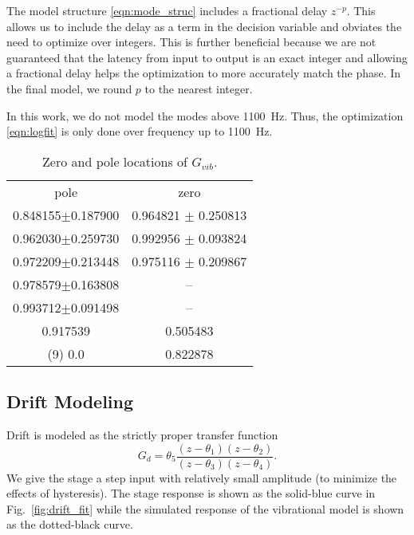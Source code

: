 \documentclass[journal,twocolumn,twoside]{IEEEtran}
\begin{document}
The model structure \eqref{eqn:mode_struc} includes a fractional delay $z^{-p}$. This allows us to include the delay as a term in the decision variable and obviates the need to optimize over integers. This is further beneficial because we are not guaranteed that the latency from input to output is an exact integer and allowing a fractional delay helps the optimization to more accurately match the phase. In the final model, we round $p$ to the nearest integer. 

In this work, we do not model the modes above 1100~Hz. Thus, the optimization \eqref{eqn:logfit} is only done over frequency up to 1100~Hz. 

\begin{table}
  \centering
  \caption{Zero and pole locations of $G_{vib}$. }
  \begin{tabular}{cc}
    pole & zero\\
    0.848155$\pm$0.187900 & 0.964821 $\pm$ 0.250813\\ 
    0.962030$\pm$0.259730 & 0.992956 $\pm$ 0.093824\\ 
    0.972209$\pm$0.213448 & 0.975116 $\pm$ 0.209867\\ 
    0.978579$\pm$0.163808 & --\\ 
    0.993712$\pm$0.091498 & --\\ 
    0.917539 & 0.505483 \\ 
    (9) 0.0 & 0.822878 \\ 
  \end{tabular}
\end{table}


\subsection{Drift Modeling}\label{sec:drift_model}
Drift is modeled as the strictly proper transfer function
\begin{equation}
G_d = \theta_5\frac{(z-\theta_1)(z-\theta_2)}{(z-\theta_3)(z-\theta_4)}.\label{eqn:fit_drift_cost}
\end{equation}
We give the stage a step input with relatively small amplitude (to minimize the effects of hysteresis). The stage response is shown as the solid-blue curve in Fig.~\ref{fig:drift_fit} while the simulated response of the vibrational model is shown as the dotted-black curve. 
\end{document}
